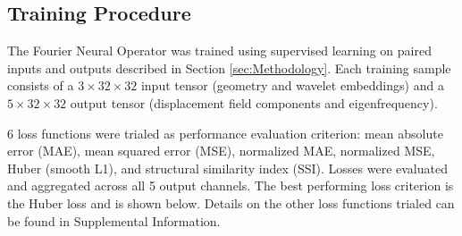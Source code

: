 \documentclass[preprint,review,12pt]{elsarticle}
\begin{document}


\subsection{Training Procedure}
\label{ssec:training_procedure}
The Fourier Neural Operator was trained using supervised learning on paired inputs and outputs described in Section \ref{sec:Methodology}. Each training sample consists of a $3 \times 32 \times 32$ input tensor (geometry and wavelet embeddings) and a $5 \times 32 \times 32$ output tensor (displacement field components and eigenfrequency).

6 loss functions were trialed as performance evaluation criterion: mean absolute error (MAE), mean squared error (MSE), normalized MAE, normalized MSE, Huber (smooth L1), and structural similarity index (SSI). Losses were evaluated and aggregated across all 5 output channels. The best performing loss criterion is the Huber loss and is shown below. Details on the other loss functions trialed can be found in Supplemental Information.

\end{document}
